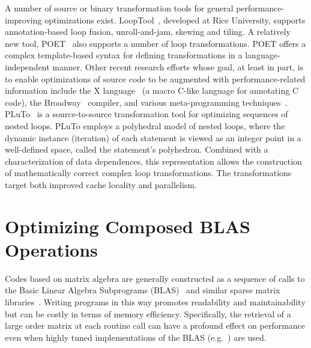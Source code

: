 \documentclass[runningheads]{llncs}
\begin{document}

A number of source or binary transformation tools for general
performance-improving optimizations exist. LoopTool~\cite{LoopTool},
developed at Rice University, supports annotation-based loop fusion,
unroll-and-jam, skewing and tiling.  A relatively new tool, POET~\cite{POET}
also supports a number of loop transformations. POET offers a complex
template-based syntax for defining transformations in a language-independent
manner. Other recent research efforts whose goal, at least in part, is to
enable optimizations of source code to be augmented with performance-related
information include the X language~\cite{XLanguage} (a macro C-like language
for annotating C code), the Broadway~\cite{broadway} compiler, and various
meta-programming
techniques~\cite{veldhuizen95,weise93,kiczales91,chiba95}. PLuTo~\cite{Pluto,uday08cc}
is a source-to-source transformation tool for optimizing sequences of nested
loops. PLuTo employs a polyhedral model of nested loops, where the dynamic
instance (iteration) of each statement is viewed as an integer point in a
well-defined space, called the statement's polyhedron. Combined with a
characterization of data dependences, this representation allows the
construction of mathematically correct complex loop transformations. The
transformations target both improved cache locality and parallelism.

\section{Optimizing Composed BLAS Operations}
\label{sec:approach}

Codes based on matrix algebra are generally constructed as a sequence of
calls to the Basic Linear Algebra Subprograms
(BLAS)~\cite{Dongarra:1988uq,Lawson:1979kx,Dongarra:1990fk} and similar
sparse matrix libraries~\cite{Saad:fr,George:1981uq}. Writing programs in
this way promotes readability and maintainability but can be costly in terms
of memory efficiency. Specifically, the retrieval of a large order matrix at
each routine call can have a profound effect on performance even when highly
tuned implementations of the BLAS
(e.g.~\cite{Bilmes:1997ye,Whaley:1998fk,IntelMath:oq,ESSL:kl,Goto:2006fk})
are used.
\end{document}

